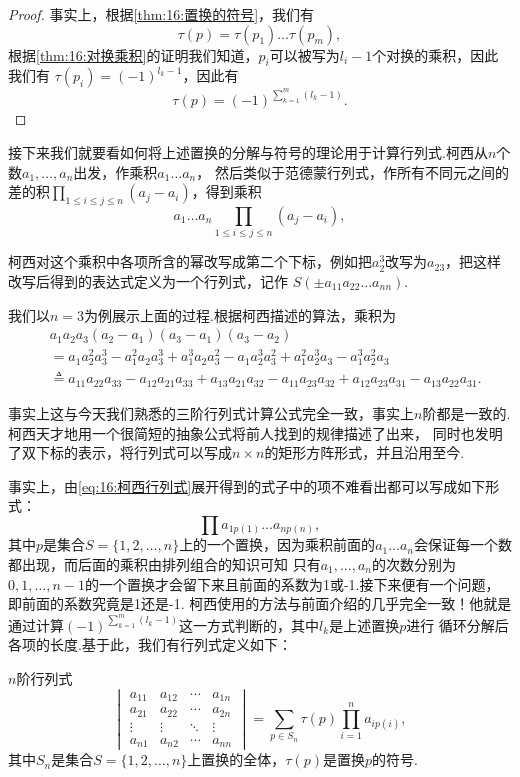 \begin{proof}
    事实上，根据\autoref{thm:16:置换的符号}，我们有
    \[\tau(p)=\tau(p_1)\ldots\tau(p_m),\]
    根据\autoref{thm:16:对换乘积}的证明我们知道，$p_i$可以被写为$l_i-1$个对换的乘积，因此我们有
    $\tau(p_i)=(-1)^{l_k-1}$，因此有
    \[\tau(p)=(-1)^{\sum\limits_{k=1}^m(l_k-1)}.\]
\end{proof}

接下来我们就要看如何将上述置换的分解与符号的理论用于计算行列式.柯西从$n$个数$a_1,\ldots,a_n$出发，作乘积$a_1\ldots a_n$，
然后类似于范德蒙行列式，作所有不同元之间的差的积$\prod\limits_{1\leqslant i\le j\leqslant n}(a_j-a_i)$，得到乘积
\begin{equation}\label{eq:16:柯西行列式}
    a_1\ldots a_n\prod\limits_{1\leqslant i\le j\leqslant n}(a_j-a_i),
\end{equation}

柯西对这个乘积中各项所含的幂改写成第二个下标，例如把$a_2^3$改写为$a_{23}$，把这样改写后得到的表达式定义为一个行列式，记作
$S(\pm a_{11}a_{22}\ldots a_{nn})$.

我们以$n=3$为例展示上面的过程.根据柯西描述的算法，乘积为
\begin{align*}
    &a_1a_2a_3(a_2-a_1)(a_3-a_1)(a_3-a_2)\\
    &=a_1a_2^2a_3^3-a_1^2a_2a_3^3+a_1^3a_2a_3^2-a_1a_2^3a_3^2+a_1^2a_2^3a_3-a_1^3a_2^2a_3\\
    &\triangleq a_{11}a_{22}a_{33}-a_{12}a_{21}a_{33}+a_{13}a_{21}a_{32}-a_{11}a_{23}a_{32}+a_{12}a_{23}a_{31}-a_{13}a_{22}a_{31}.
\end{align*}

事实上这与今天我们熟悉的三阶行列式计算公式完全一致，事实上$n$阶都是一致的.柯西天才地用一个很简短的抽象公式将前人找到的规律描述了出来，
同时也发明了双下标的表示，将行列式可以写成$n\times n$的矩形方阵形式，并且沿用至今.

事实上，由\autoref{eq:16:柯西行列式}展开得到的式子中的项不难看出都可以写成如下形式：
\[\prod a_{1p(1)}\ldots a_{np(n)},\]
其中$p$是集合$S=\{1,2,\ldots,n\}$上的一个置换，因为乘积前面的$a_1\ldots a_n$会保证每一个数都出现，而后面的乘积由排列组合的知识可知
只有$a_1,\ldots,a_n$的次数分别为$0,1,\ldots,n-1$的一个置换才会留下来且前面的系数为1或-1.接下来便有一个问题，即前面的系数究竟是1还是-1.
柯西使用的方法与前面介绍的几乎完全一致！他就是通过计算$(-1)^{\sum\limits_{k=1}^m(l_k-1)}$这一方式判断的，其中$l_k$是上述置换$p$进行
循环分解后各项的长度.基于此，我们有行列式定义如下：
\begin{definition}
    $n$阶行列式
    \[\begin{vmatrix}
        a_{11}&a_{12}&\cdots&a_{1n}\\
        a_{21}&a_{22}&\cdots&a_{2n}\\
        \vdots&\vdots&\ddots&\vdots\\
        a_{n1}&a_{n2}&\cdots&a_{nn}
    \end{vmatrix}=\sum\limits_{p\in S_n}\tau(p)\prod\limits_{i=1}^na_{ip(i)},\]
    其中$S_n$是集合$S=\{1,2,\ldots,n\}$上置换的全体，$\tau(p)$是置换$p$的符号.
\end{definition}

